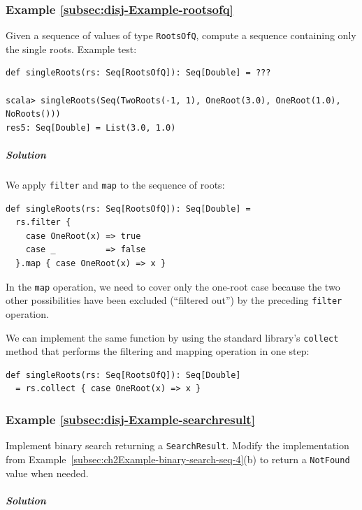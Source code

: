\subsubsection{Example \label{subsec:disj-Example-rootsofq}\ref{subsec:disj-Example-rootsofq}}

Given a sequence of values of type \lstinline!RootsOfQ!, compute
a sequence containing only the single roots. Example test:
\begin{lstlisting}
def singleRoots(rs: Seq[RootsOfQ]): Seq[Double] = ???

scala> singleRoots(Seq(TwoRoots(-1, 1), OneRoot(3.0), OneRoot(1.0), NoRoots()))
res5: Seq[Double] = List(3.0, 1.0) 
\end{lstlisting}


\subparagraph{Solution}

We apply \lstinline!filter! and \lstinline!map! to the sequence
of roots:
\begin{lstlisting}
def singleRoots(rs: Seq[RootsOfQ]): Seq[Double] =
  rs.filter {
    case OneRoot(x) => true
    case _          => false
  }.map { case OneRoot(x) => x }
\end{lstlisting}
In the \lstinline!map! operation, we need to cover only the one-root
case because the two other possibilities have been excluded (\textsf{``}filtered
out\textsf{''}) by the preceding \lstinline!filter! operation. 

We can implement the same function by using the standard library\textsf{'}s
\lstinline!collect! method that performs the filtering and mapping
operation in one step:
\begin{lstlisting}
def singleRoots(rs: Seq[RootsOfQ]): Seq[Double]
  = rs.collect { case OneRoot(x) => x }
\end{lstlisting}


\subsubsection{Example \label{subsec:disj-Example-searchresult}\ref{subsec:disj-Example-searchresult}}

Implement binary search returning a \lstinline!SearchResult!. Modify
the implementation from Example~\ref{subsec:ch2Example-binary-search-seq-4}(b)
to return a \lstinline!NotFound! value when needed.

\subparagraph{Solution}

